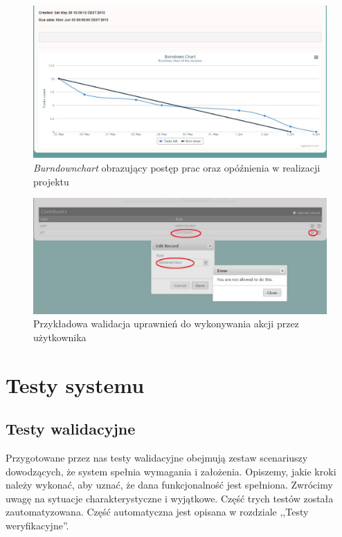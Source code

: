 \documentclass[a4paper,12pt,notitlepage]{mwrep}
\begin{document}
\begin{figure}[H]
\centering
\includegraphics[scale=0.5]{images/app/8.png}
\caption{\textit{Burndownchart} obrazujący postęp prac oraz opóźnienia w realizacji projektu}
\label{fig:app_login}
\end{figure}

\begin{figure}[H]
\centering
\includegraphics[scale=0.5]{images/app/9.png}
\caption{Przykładowa walidacja uprawnień do wykonywania akcji przez użytkownika}
\label{fig:app_RBAC}
\end{figure}


\chapter{Testy systemu}

\section{Testy walidacyjne}
Przygotowane przez nas testy walidacyjne obejmują zestaw scenariuszy dowodzących, że system spełnia wymagania i założenia. 
Opiszemy, jakie kroki należy wykonać, aby uznać, że dana funkcjonalność jest spełniona. Zwrócimy uwagę na sytuacje charakterystyczne i wyjątkowe. 
Część trych testów została zautomatyzowana. Część automatyczna jest opisana w rozdziale ,,Testy weryfikacyjne''.
\end{document}
